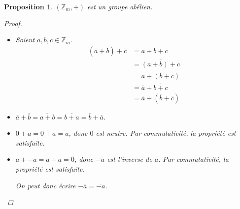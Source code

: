 \documentclass{report}
\newcommand*{\entiers}{\mathbb{Z}}
\newtheorem*{prop}{Proposition}
\theoremstyle{definition}
\theoremstyle{remark}
\begin{document}
	\begin{prop}
		$(\entiers_m,+)$ est un groupe ab\'elien.
		\begin{proof}~

			\begin{itemize}
				\item[(A)] Soient $a,b,c \in \entiers_m$.
				\begin{align*}
					\left( \overline{a} + \overline{b} \right) + \overline{c}&= \overline{a+b} + \overline{c}\\
					&= \overline{(a+b)+c}\\
					&= \overline{a+(b+c)}\\
					&= \overline{a} + \overline{b+c}\\
					&= \overline{a} + \left( \overline{b} + \overline{c} \right)
				\end{align*}
				\item[(C)] $\overline{a} + \overline{b} = \overline{a+b} = \overline{b+a} = \overline{b} + \overline{a}$.
				\item[(N)] $\overline{0} + \overline{a} = \overline{0+a} = \overline{a}$, donc $\overline{0}$ est neutre. Par commutativit\'e, la propri\'et\'e est satisfaite.
				\item[(I)] $\overline{a} + \overline{-a} = \overline{a-a} = \overline{0}$, donc $\overline{-a}$ est l'inverse de $\overline{a}$. Par commutativit\'e, la propri\'et\'e est satisfaite.

				On peut donc \'ecrire $-\overline{a} = \overline{-a}$.
			\end{itemize}
		\end{proof}
	\end{prop}
\end{document}
